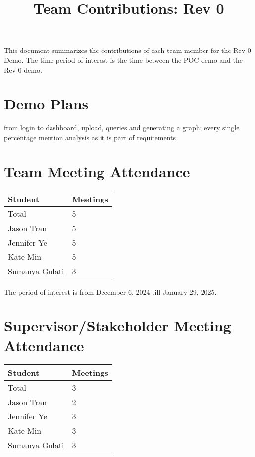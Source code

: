 \documentclass{article}
\title{Team Contributions: Rev 0\\\progname}
\author{\authname}
\date{}
\begin{document}
\maketitle

This document summarizes the contributions of each team member for the Rev 0
Demo.  The time period of interest is the time between the POC demo and the Rev
0 demo.

\section{Demo Plans}
from login to dashboard, upload, queries and generating a graph; every single percentage
mention analysis as it is part of requirements

\section{Team Meeting Attendance}

\begin{table}[H]
\centering
\begin{tabular}{ll}
\toprule
\textbf{Student} & \textbf{Meetings}\\
\midrule
Total & 5\\
Jason Tran & 5\\
Jennifer Ye & 5\\
Kate Min & 5\\
Sumanya Gulati & 3\\
\bottomrule
\end{tabular}
\end{table}

The period of interest is from December 6, 2024 till January 29, 2025.

\section{Supervisor/Stakeholder Meeting Attendance}

\begin{table}[H]
\centering
\begin{tabular}{ll}
\toprule
\textbf{Student} & \textbf{Meetings}\\
\midrule
Total & 3\\
Jason Tran & 2\\
Jennifer Ye & 3\\
Kate Min & 3\\
Sumanya Gulati & 3\\
\bottomrule
\end{tabular}
\end{table}
\end{document}
